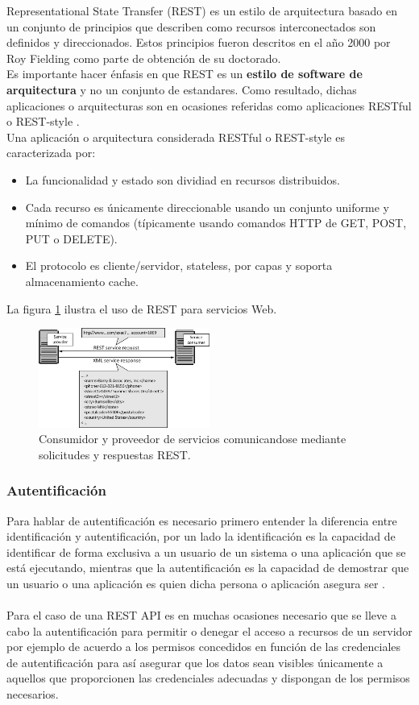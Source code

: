 Representational State Transfer (REST) es un estilo de arquitectura basado en un conjunto de principios que describen como recursos interconectados son definidos y direccionados. Estos principios fueron descritos en el año 2000 por Roy Fielding como parte de obtención de su doctorado.
\\
Es importante hacer énfasis en que REST es un \textbf{estilo de software de arquitectura} y no un conjunto de estandares. Como resultado, dichas aplicaciones o arquitecturas son en ocasiones referidas como aplicaciones RESTful o REST-style \cite{restArticle}. 
\\
Una aplicación o arquitectura considerada RESTful o REST-style es caracterizada por:
\begin{itemize}
	\item La funcionalidad y estado son dividiad en recursos distribuidos.
	\item Cada recurso es únicamente direccionable usando un conjunto uniforme y mínimo de comandos (típicamente usando comandos HTTP de GET, POST, PUT o DELETE).
	\item El protocolo es cliente/servidor, stateless, por capas y soporta almacenamiento cache.
\end{itemize} 
 La figura \ref{fig:rest_mess} ilustra el uso de REST para servicios Web.
\begin{figure}[H]
	\centering
	\includegraphics[width=0.5\textwidth]{capitulo2/images/rest_messages.jpg}
	\caption{Consumidor y proveedor de servicios comunicandose mediante solicitudes y respuestas REST.}
	\label{fig:rest_mess}
\end{figure}  
\subsubsection{Autentificación}
Para hablar de autentificación es necesario primero entender la diferencia entre identificación y autentificación, por un lado la identificación es la capacidad de identificar de forma exclusiva a un usuario de un sistema o una aplicación que se está ejecutando, mientras que la autentificación es la capacidad de demostrar que un usuario o una aplicación es quien dicha persona o aplicación asegura ser \cite{authent}.\\\\
Para el caso de una REST API es en muchas ocasiones necesario que se lleve a cabo la autentificación para permitir o denegar el acceso a recursos de un servidor por ejemplo de acuerdo a los permisos concedidos en función de las credenciales de autentificación para así asegurar que los datos sean visibles únicamente a aquellos que proporcionen las credenciales adecuadas y dispongan de los permisos necesarios.

